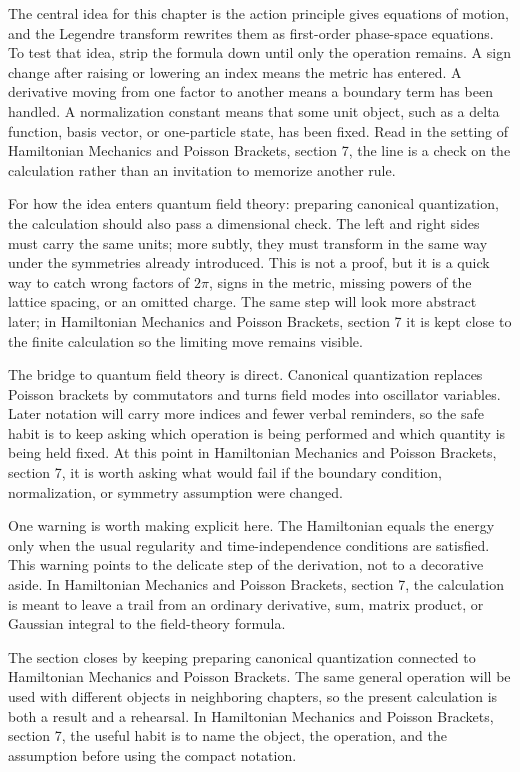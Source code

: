 The central idea for this chapter is the action principle gives equations of motion, and the Legendre transform rewrites them as first-order phase-space equations.  To test that idea, strip the formula down until only the operation remains.  A sign change after raising or lowering an index means the metric has entered.  A derivative moving from one factor to another means a boundary term has been handled.  A normalization constant means that some unit object, such as a delta function, basis vector, or one-particle state, has been fixed.  Read in the setting of Hamiltonian Mechanics and Poisson Brackets, section 7, the line is a check on the calculation rather than an invitation to memorize another rule.

For how the idea enters quantum field theory: preparing canonical quantization, the calculation should also pass a dimensional check.  The left and right sides must carry the same units; more subtly, they must transform in the same way under the symmetries already introduced.  This is not a proof, but it is a quick way to catch wrong factors of \(2\pi\), signs in the metric, missing powers of the lattice spacing, or an omitted charge.  The same step will look more abstract later; in Hamiltonian Mechanics and Poisson Brackets, section 7 it is kept close to the finite calculation so the limiting move remains visible.

The bridge to quantum field theory is direct.  Canonical quantization replaces Poisson brackets by commutators and turns field modes into oscillator variables.  Later notation will carry more indices and fewer verbal reminders, so the safe habit is to keep asking which operation is being performed and which quantity is being held fixed.  At this point in Hamiltonian Mechanics and Poisson Brackets, section 7, it is worth asking what would fail if the boundary condition, normalization, or symmetry assumption were changed.

One warning is worth making explicit here.  The Hamiltonian equals the energy only when the usual regularity and time-independence conditions are satisfied.  This warning points to the delicate step of the derivation, not to a decorative aside.  In Hamiltonian Mechanics and Poisson Brackets, section 7, the calculation is meant to leave a trail from an ordinary derivative, sum, matrix product, or Gaussian integral to the field-theory formula.

The section closes by keeping preparing canonical quantization connected to Hamiltonian Mechanics and Poisson Brackets.  The same general operation will be used with different objects in neighboring chapters, so the present calculation is both a result and a rehearsal.  In Hamiltonian Mechanics and Poisson Brackets, section 7, the useful habit is to name the object, the operation, and the assumption before using the compact notation.




